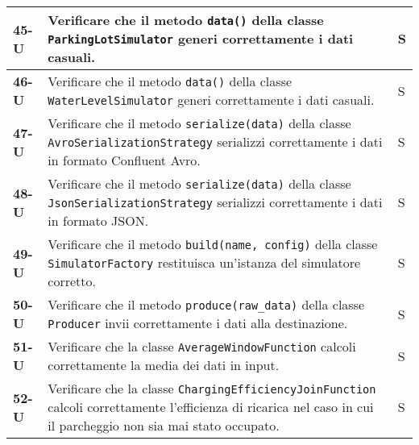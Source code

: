 \begin{longtable}{|>{\raggedright\arraybackslash}m{}|>{\raggedright\arraybackslash}m{}|>{\raggedright\arraybackslash}m{}|}
	\hline
	\textbf{45-U}   & Verificare che il metodo \texttt{data()} della classe \texttt{ParkingLotSimulator} generi correttamente i dati casuali.                                                                                                                          & S              \\
	\hline
	\textbf{46-U}   & Verificare che il metodo \texttt{data()} della classe \texttt{WaterLevelSimulator} generi correttamente i dati casuali.                                                                                                                          & S              \\
	\hline
	\textbf{47-U}   & Verificare che il metodo \texttt{serialize(data)} della classe \texttt{AvroSerializationStrategy} serializzi correttamente i dati in formato Confluent Avro.                                                                                     & S              \\
	\hline
	\textbf{48-U}   & Verificare che il metodo \texttt{serialize(data)} della classe \texttt{JsonSerializationStrategy} serializzi correttamente i dati in formato JSON.                                                                                               & S              \\
	\hline
	\textbf{49-U}   & Verificare che il metodo \texttt{build(name, config)} della classe \texttt{SimulatorFactory} restituisca un'istanza del simulatore corretto.                                                                                                     & S              \\
	\hline
	\textbf{50-U}   & Verificare che il metodo \texttt{produce(raw\_data)} della classe \texttt{Producer} invii correttamente i dati alla destinazione.                                                                                                                & S              \\
	\hline
	\multicolumn{3}{|c|}{\textbf{Apache Flink}}
	\hline
	\textbf{51-U}   & Verificare che la classe \texttt{AverageWindowFunction} calcoli correttamente la media dei dati in input.                                                                                                                                        & S              \\
	\hline
	\textbf{52-U}   & Verificare che la classe \texttt{ChargingEfficiencyJoinFunction} calcoli correttamente l'efficienza di ricarica nel caso in cui il parcheggio non sia mai stato occupato.                                                                        & S              \\

\end{longtable}
